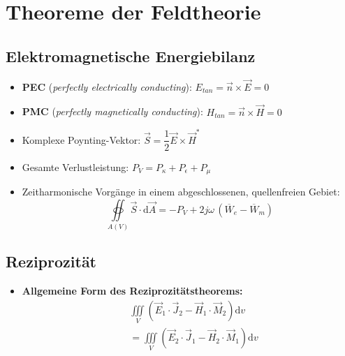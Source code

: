 \vspace{1cm}
{\small%
\section{Theoreme der Feldtheorie}
\subsection{Elektromagnetische Energiebilanz}
\begin{itemize}
    \itemsep0pt
    \item \textbf{PEC} (\textit{perfectly electrically conducting}): \(E_{tan} = \vec{n} \times \vec{E} = 0\)
    \item \textbf{PMC} (\textit{perfectly magnetically conducting}): \(H_{tan} = \vec{n} \times \vec{H} = 0\)
    \item Komplexe Poynting-Vektor: \(\vec{S} = \dfrac{1}{2} \vec{E} \times \vec{H}^*\)
    \item Gesamte Verlustleistung: \(P_V = P_\kappa + P_\epsilon + P_\mu\)
    \item Zeitharmonische Vorgänge in einem abgeschlossenen, quellenfreien Gebiet:\\
        \[\oiint\limits_{A(V)}\vec{S}\cdot\mathrm{d}\vec{A} = - P_V + 2j\omega\,(\overline{W}_e - \overline{W}_m)\]
\end{itemize}
\subsection{Reziprozität}
\begin{itemize}
    \item \textbf{Allgemeine Form des Reziprozitätstheorems:}\\
        \begin{align*}
            &\iiint\limits_V\left(\vec{E}_1 \cdot \vec{J}_2 - \vec{H}_1 \cdot \vec{M}_2\right)\mathrm{d}v\\
            &= \iiint\limits_V\left(\vec{E}_2 \cdot \vec{J}_1 - \vec{H}_2 \cdot \vec{M}_1\right)\mathrm{d}v
        \end{align*}
\end{itemize}
}
